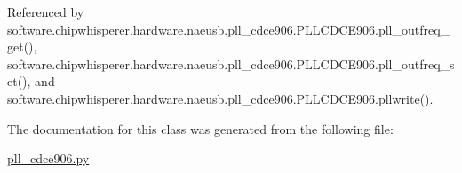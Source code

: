 Referenced by software.\+chipwhisperer.\+hardware.\+naeusb.\+pll\+\_\+cdce906.\+P\+L\+L\+C\+D\+C\+E906.\+pll\+\_\+outfreq\+\_\+get(), software.\+chipwhisperer.\+hardware.\+naeusb.\+pll\+\_\+cdce906.\+P\+L\+L\+C\+D\+C\+E906.\+pll\+\_\+outfreq\+\_\+set(), and software.\+chipwhisperer.\+hardware.\+naeusb.\+pll\+\_\+cdce906.\+P\+L\+L\+C\+D\+C\+E906.\+pllwrite().



The documentation for this class was generated from the following file\+:\begin{DoxyCompactItemize}
\item 
\hyperlink{pll__cdce906_8py}{pll\+\_\+cdce906.\+py}\end{DoxyCompactItemize}
